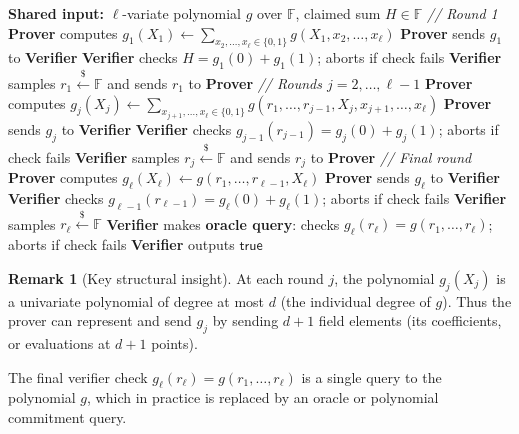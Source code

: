 \documentclass[11pt]{article}
\theoremstyle{plain}
\theoremstyle{definition}
\newtheorem{remark}[theorem]{Remark}
\newcommand{\F}{\mathbb{F}}
\begin{document}
\begin{algorithm}[H]
  \caption{Sumcheck Protocol}
  \begin{algorithmic}[1]
    \State \textbf{Shared input:} $\ell$-variate polynomial $g$ over $\F$, claimed sum $H \in \F$
    \Statex
    \textit{// Round 1}
    \State \textbf{Prover} computes $g_1(X_1) \gets \displaystyle\sum_{x_2,\ldots,x_\ell \in \{0,1\}} g(X_1, x_2, \ldots, x_\ell)$
    \State \textbf{Prover} sends $g_1$ to \textbf{Verifier}
    \State \textbf{Verifier} checks $H = g_1(0) + g_1(1)$; aborts if check fails
    \State \textbf{Verifier} samples $r_1 \xleftarrow{\$} \F$ and sends $r_1$ to \textbf{Prover}
    \Statex
    \textit{// Rounds $j = 2, \ldots, \ell - 1$}
      \State \textbf{Prover} computes $g_j(X_j) \gets \displaystyle\sum_{x_{j+1},\ldots,x_\ell \in \{0,1\}} g(r_1, \ldots, r_{j-1}, X_j, x_{j+1}, \ldots, x_\ell)$
      \State \textbf{Prover} sends $g_j$ to \textbf{Verifier}
      \State \textbf{Verifier} checks $g_{j-1}(r_{j-1}) = g_j(0) + g_j(1)$; aborts if check fails
      \State \textbf{Verifier} samples $r_j \xleftarrow{\$} \F$ and sends $r_j$ to \textbf{Prover}
    \EndFor
    \Statex
    \textit{// Final round}
    \State \textbf{Prover} computes $g_\ell(X_\ell) \gets g(r_1, \ldots, r_{\ell-1}, X_\ell)$
    \State \textbf{Prover} sends $g_\ell$ to \textbf{Verifier}
    \State \textbf{Verifier} checks $g_{\ell-1}(r_{\ell-1}) = g_\ell(0) + g_\ell(1)$; aborts if check fails
    \State \textbf{Verifier} samples $r_\ell \xleftarrow{\$} \F$
    \State \textbf{Verifier} makes \textbf{oracle query}: checks $g_\ell(r_\ell) = g(r_1, \ldots, r_\ell)$; aborts if check fails
    \State \textbf{Verifier} outputs $\mathsf{true}$
  \end{algorithmic}
\end{algorithm}

\medskip

\begin{remark}[Key structural insight]
  At each round $j$, the polynomial $g_j(X_j)$ is a univariate polynomial of degree at most $d$
  (the individual degree of $g$). Thus the prover can represent and send $g_j$ by sending $d+1$
  field elements (its coefficients, or evaluations at $d+1$ points).

  The final verifier check $g_\ell(r_\ell) = g(r_1, \ldots, r_\ell)$ is a single query to the
  polynomial $g$, which in practice is replaced by an oracle or polynomial commitment query.
\end{remark}
\end{document}
